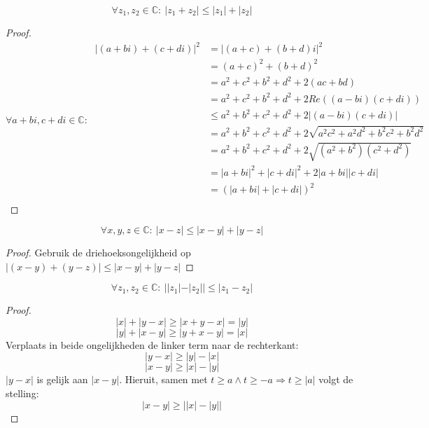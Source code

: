 \documentclass[main.tex]{subfiles}
\begin{document}
\begin{pr}
  \[ \forall z_{1},z_{2}\in \mathbb{C}:\ |z_{1}+z_{2}| \le |z_{1}|+|z_{2}| \]

  \begin{proof}
    \[
    \forall a+bi,c+di \in \mathbb{C}:\
    \begin{array}{rll}
      |(a+bi)+(c+di)|^{2} &= |(a+c)+(b+d)i|^{2}\\
      &= (a+c)^{2}+ (b+d)^{2}\\
      &= a^{2}+c^{2} + b^{2}+d^{2}+2(ac + bd)\\
      &= a^{2}+c^{2} + b^{2}+d^{2}+2Re((a-bi)(c+di))\\
      &\le a^{2}+b^{2} + c^{2}+d^{2} + 2|(a-bi)(c+di)|\\
      &= a^{2}+b^{2} + c^{2}+d^{2} + 2\sqrt{a^{2}c^{2} + a^{2}d^{2} +b^{2}c^{2}+ b^{2}d^{2}}\\
      &= a^{2}+b^{2} + c^{2}+d^{2} + 2\sqrt{(a^{2}+b^{2})(c^{2}+d^{2})}\\
      &= |a+bi|^{2} + |c+di|^{2} + 2|a+bi||c+di|\\
      &= \left(|a+bi|+|c+di|\right)^{2}\\
    \end{array}
    \]
  \end{proof}
\end{pr}

\begin{pr}
  \label{pr:tweede-driehoeksongelijkheid-C}
  \[ \forall x,y,z\in \mathbb{C}:\ |x-z| \le |x-y| + |y-z| \]

  \begin{proof}
    Gebruik de driehoeksongelijkheid op $|(x-y)+(y-z)| \le |x-y| + |y-z|$
  \end{proof}
\end{pr}

\begin{pr}
  \[ \forall z_{1},z_{2}\in \mathbb{C}:\ ||z_{1}|-|z_{2}|| \le |z_{1}-z_{2}| \]

  \begin{proof}
    \[ |x| + |y-x| \ge |x+y-x| = |y| \]
    \[ |y| + |x-y| \ge |y+x-y| = |x| \]
    Verplaats in beide ongelijkheden de linker term naar de rechterkant:
    \[ |y-x| \ge |y| - |x| \]
    \[ |x-y| \ge |x| - |y| \]
    $|y-x|$ is gelijk aan $|x-y|$. Hieruit, samen met $t \ge a \wedge t \ge -a \Rightarrow t \ge |a|$ volgt de stelling:
    \[ |x-y| \ge \left||x|-|y|\right| \]
  \end{proof}
\end{pr}
\end{document}
